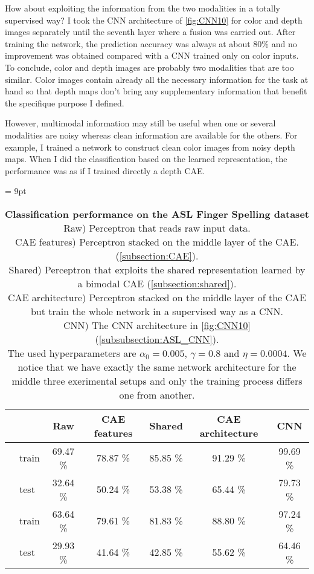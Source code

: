 How about exploiting the information from the two modalities in a
totally supervised way? I took the CNN architecture of \autoref{fig:CNN10}
for color and depth images separately until the seventh layer where
a fusion was carried out. After training the network, the prediction
accuracy was always at about 80\% and no improvement was obtained compared
with a CNN trained only on color inputs. To conclude, color and depth
images are probably two modalities that are too similar. Color images
contain already all the necessary information for the task at hand so
that depth maps don't bring any supplementary information that benefit
the specifique purpose I defined.

However, multimodal information may still be useful when one or several
modalities are noisy whereas clean information are available for the others.
For example, I trained a network to construct clean color images from
noisy depth maps. When I did the classification based on the learned
representation, the performance was as if I trained directly a depth CAE.

\begin{table}[H]
  \tabcolsep = 9pt
  \caption{\textbf{Classification performance on the ASL Finger Spelling
    dataset}\\[0.1em]
    Raw) Perceptron that reads raw input data.\\[0.1em]
    CAE features) Perceptron stacked on the middle layer of the CAE.
      (\ref{subsection:CAE}).\\[0.1em]
    Shared) Perceptron that exploits the shared representation learned
      by a bimodal CAE (\ref{subsection:shared}).\\[0.1em]
    CAE architecture) Perceptron stacked on the middle layer of the CAE
      but train the whole network in a supervised way as a CNN.\\[0.1em]
    CNN) The CNN architecture in \autoref{fig:CNN10}
      (\ref{subsubsection:ASL_CNN}). \\[0.1em]
    The used hyperparameters are $\alpha_0=0.005$, $\gamma=0.8$ and
    $\eta=0.0004$. We notice that we have exactly the same network
    architecture for the middle three exerimental setups and only the
    training process differs one from another.
    }
  \label{tab:ASL_classif}
  \begin{tabular*}{\linewidth}{>{\bf}llccccc}
    \toprule
    && Raw & CAE features & Shared & CAE architecture & CNN\\
    \midrule
    \multirow{2}{*}{Intensity} &
    train & 69.47 \% & 78.87 \% & 85.85 \% & 91.29 \% & 99.69 \% \\
    & test & 32.64 \% & 50.24 \% & 53.38 \% & 65.44 \% & 79.73 \% \\
    \midrule
    \multirow{2}{*}{Depth} &
    train & 63.64 \% & 79.61 \% & 81.83 \% & 88.80 \% & 97.24 \% \\
    & test & 29.93 \% & 41.64 \% & 42.85 \% & 55.62 \% & 64.46 \% \\
    \bottomrule
  \end{tabular*}
\end{table}

